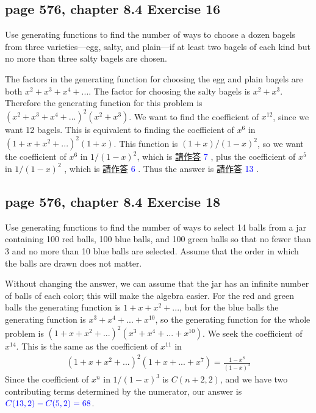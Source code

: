 \documentclass[sigconf]{acmart}
\newcommand{\answer}[2]{%
  \if\relax\detokenize{#2}\relax
    \underline{\mbox{請作答}}%
  \else
    \textcolor{blue}{#2}%
  \fi
}
\begin{document}
\subsection{page 576, chapter 8.4 Exercise 16}
\begin{shaded}
    Use generating functions to find the number of ways to choose a dozen bagels from three varieties—egg, salty, and plain—if at least two bagels of each kind but no more than three salty bagels are chosen.
\end{shaded}
The factors in the generating function for choosing the egg and plain bagels are both $x^2 + x^3 + x^4 + ...$. The factor for choosing the salty bagels is $x^2 + x^3$. Therefore the generating function for this problem is $(x^2 + x^3 + x^4 + ...)^2(x^2 + x^3)$. We want to find the coefficient of $x^{12}$, since we want 12 bagels. This is equivalent to finding the coefficient of $x^6$ in $(1 + x + x^2 + ...)^2(1 + x)$. This function is $(1 + x)/(1 - x)^2$, so we want the coefficient of $x^6$ in $1/(1 - x)^2$, which is \answer{8.4.16a}{7}, plus the coefficient of $x^5$ in $1/(1 - x)^2$ , which is \answer{8.4.16b}{6}. Thus the answer is \answer{8.4.16c}{13}.


\subsection{page 576, chapter 8.4 Exercise 18}
\begin{shaded}
    Use generating functions to find the number of ways to select 14 balls from a jar containing 100 red balls, 100 blue balls, and 100 green balls so that no fewer than 3 and no more than 10 blue balls are selected. Assume that the order in which the balls are drawn does not matter.
\end{shaded}
Without changing the answer, we can assume that the jar has an infinite number of balls of each color; this will make the algebra easier. For the red and green balls the generating function is $1 + x + x^2 + ...$, but for the blue balls the generating function is $x^3 + x^4 + ...+ x^{10}$, so the generating function for the whole problem is $(1 + x + x^2 + ...)^2(x^3 + x^4 + ...+ x^{10})$. We seek the coefficient of $x^{14}$. This is the same as the coefficient
of $x^{11}$ in
    \begin{eqnarray*}
    (1 + x + x^2 + ...)^2(1 + x + ...+ x^7) = \frac{1 - x^8}{(1-x)^3}
    \end{eqnarray*}
Since the coefficient of $x^n$ in $1/(1 - x)^3$ is $C(n + 2, 2)$, and we have two contributing terms determined by the numerator, our answer is $\answer{8.4.18a}{C(13,2) - C(5,2) = 68}$.
\end{document}
